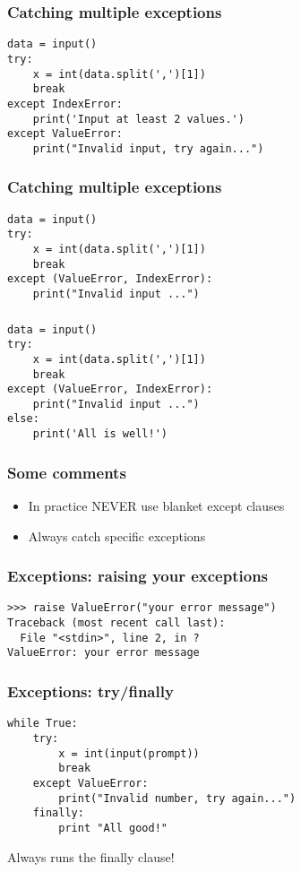 \documentclass[14pt,compress]{beamer}
\begin{document}
\begin{frame}[fragile]
  \frametitle{Catching multiple exceptions}
\begin{lstlisting}
data = input()
try:
    x = int(data.split(',')[1])
    break
except IndexError:
    print('Input at least 2 values.')
except ValueError:
    print("Invalid input, try again...")

\end{lstlisting}
\end{frame}


\begin{frame}[fragile]
  \frametitle{Catching multiple exceptions}
\begin{lstlisting}
data = input()
try:
    x = int(data.split(',')[1])
    break
except (ValueError, IndexError):
    print("Invalid input ...")

\end{lstlisting}
\end{frame}

\begin{frame}[fragile]
  \frametitle{}
\begin{lstlisting}
data = input()
try:
    x = int(data.split(',')[1])
    break
except (ValueError, IndexError):
    print("Invalid input ...")
else:
    print('All is well!')
  \end{lstlisting}

\end{frame}


\begin{frame}
  \frametitle{Some comments}
  \begin{itemize}
  \item In practice NEVER use blanket except clauses
  \item Always catch specific exceptions
  \end{itemize}
\end{frame}

\begin{frame}[fragile]
  \frametitle{Exceptions: raising your exceptions}
\small
\begin{lstlisting}
>>> raise ValueError("your error message")
Traceback (most recent call last):
  File "<stdin>", line 2, in ?
ValueError: your error message
\end{lstlisting}
\end{frame}



\begin{frame}[fragile]
  \frametitle{Exceptions: try/finally}
  \small
\begin{lstlisting}
while True:
    try:
        x = int(input(prompt))
        break
    except ValueError:
        print("Invalid number, try again...")
    finally:
        print "All good!"

      \end{lstlisting}
      \normalsize
      Always runs the finally clause!
\end{frame}
\end{document}
